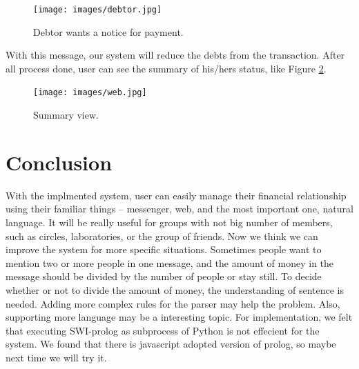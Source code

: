 \documentclass[11pt]{article}
\begin{document}
\begin{figure}[!htbp]
  \centering
  \texttt{[image: images/debtor.jpg]}
  \caption{Debtor wants a notice for payment.}
  \label{fig:debtor}
\end{figure}

With this message, our system will reduce the debts from the transaction.
After all process done, user can see the summary of his/hers status,
like Figure \ref{fig:summary}.

\begin{figure}[!htbp]
  \centering
  \texttt{[image: images/web.jpg]}
  \caption{Summary view.}
  \label{fig:summary}
\end{figure}

\section{Conclusion}
With the implmented system, user can easily manage their
financial relationship using their familiar things -- messenger, web, and
the most important one, natural language.
It will be really useful for groups with not big number of members,
such as circles, laboratories, or the group of friends.
Now we think we can improve the system for more specific situations.
Sometimes people want to mention two or more people in one message,
and the amount of money in the message should be divided by the number of people
or stay still. To decide whether or not to divide the amount of money,
the understanding of sentence is needed.
Adding more complex rules for the parser may help the problem.
Also, supporting more language may be a interesting topic.
For implementation, we felt that executing SWI-prolog as subprocess of Python
is not effecient for the system. We found that there is javascript adopted
version of prolog, so maybe next time we will try it.
\end{document}
